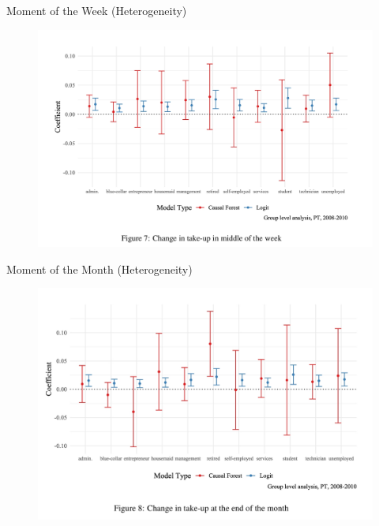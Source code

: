 \documentclass{beamer}
\begin{document}
\begin{frame}{Moment of the Week (Heterogeneity)}
\begin{figure}[h!]
    \centering
    \includegraphics[width=.9\textwidth]{ressources/fig7.jpeg}
\end{figure}
\end{frame}

\begin{frame}{Moment of the Month (Heterogeneity)}
\begin{figure}[h!]
    \centering
    \includegraphics[width=.9\textwidth]{ressources/fig8.jpeg}
\end{figure}
\end{frame}
\end{document}
